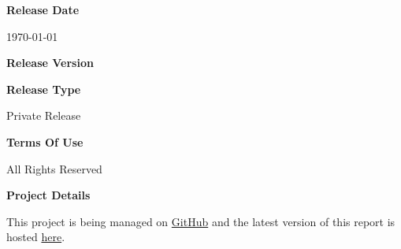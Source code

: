 \begin{titlepage}
{        \vspace{0.25cm}
        \textbf{Release Date}\par \vspace{0.125cm}
        {\today}

        \vspace{0.25cm}
        \textbf{Release Version}\par \vspace{0.125cm}
        \textbf{}

        \vspace{0.25cm}
        \textbf{Release Type}\par \vspace{0.125cm}
        {Private Release}

        \vspace{0.25cm}
        \textbf{Terms Of Use}\par \vspace{0.125cm}
        {All Rights Reserved}

        \vspace{0.25cm}
        \textbf{Project Details}\par \vspace{0.125cm}
        {This project is being managed on \href{https://github.com/ELP305-Cleaning-Machine}{GitHub} and the latest version of this report is hosted \href{https://2nav.github.io/TribeC/}{here}.}
    }
\end{titlepage}
\afterpage{\restoregeometry}    
